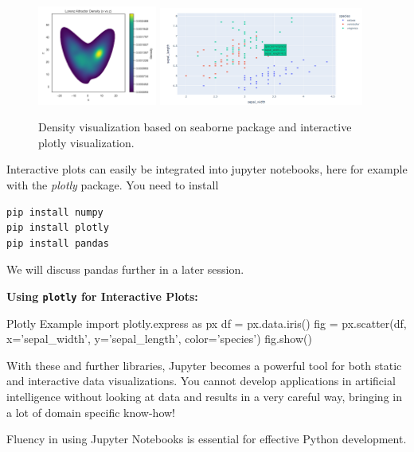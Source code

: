 \begin{center}
\begin{figure}[ht]
   \includegraphics[width=0.35\textwidth]{images/lorenz63-seaborn.png}
   \includegraphics[width=0.6\textwidth]{images/plotly_interactive.png}
	\caption{Density visualization based on seaborne package and interactive plotly visualization.}
\end{figure}
\end{center}%

Interactive plots can easily be integrated into jupyter notebooks, here for example with the \emph{plotly} package. You need to install
\begin{lstlisting}
pip install numpy
pip install plotly
pip install pandas
\end{lstlisting}
We will discuss pandas further in a later session. 

\textbf{Using \texttt{plotly} for Interactive Plots:}
\begin{codeonly}{Plotly Example}
import plotly.express as px
df = px.data.iris()
fig = px.scatter(df, x='sepal_width', y='sepal_length', color='species')
fig.show()
\end{codeonly}

With these and further libraries, Jupyter becomes a powerful tool for both static and interactive data visualizations. You cannot develop applications in artificial intelligence without looking at data and results in a very careful way, bringing in a lot of domain specific know-how! 

\begin{recommendationbox}
Fluency in using Jupyter Notebooks is essential for effective Python development. 
\end{recommendationbox}


